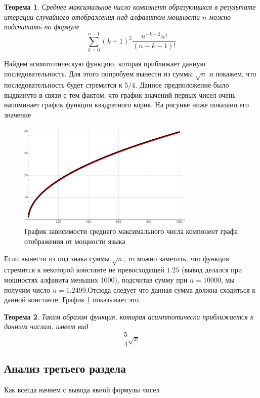 \documentclass[10pt, a4paper]{report}
\newtheorem{theorem}{Теорема}[chapter]
\theoremstyle{definition}
\begin{document}
\begin{theorem}
Среднее максимальное число компонент образующихся в результате итерации случайного отображения над алфавитом мощности $n$ можно подсчитать по формуле
$$
\sum_{k=0}^{n-1} (k+1)^2 \frac{n^{-k-2}n!}{(n-k-1)!}
$$
\end{theorem}

Найдем асимптотическую функцию, которая приближает данную последовательность. Для этого попробуем вынести из суммы $\sqrt{n}$ и покажем, что последовательность будет стремится к $5/4$. Данное предположение было выдвинуто в связи с тем фактом, что график значений первых чисел очень напоминает график функции квадратного корня. На рисунке ниже показано его значение

\begin{figure}[h]
	\centering
	\includegraphics[width=0.75\textwidth]{Comp2.jpg}
	\caption{График зависимости среднего максимального числа компонент графа отображения от мощности языка}
	\label{Comp2}
\end{figure}

Если вынести из под знака суммы $\sqrt{n}$, то можно заметить, что функция стремится к некоторой константе не превосходящей $1.25$ (вывод делался при мощностях алфавита меньших 1000), подсчитав сумму при $n=10 000$, мы получим число $n=1.2499$.Отсюда следует что данная сумма должна сходиться к данной константе. График \ref{Comp2} показывает это.

\begin{theorem}
Таким образом функция, которая асимптотически приближается к данным числам, имеет вид
$$
\frac 5 4\sqrt{x}
$$
\end{theorem}

\subsection{Анализ третьего раздела}

Как всегда начнем с вывода явной формулы чисел
\end{document}
